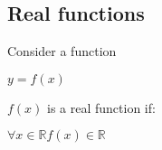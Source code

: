
\subsection{Real functions}

Consider a function

\(y=f(x)\)

\(f(x)\) is a real function if:

\(\forall x\in \mathbb{R} f(x) \in \mathbb{R}\)


